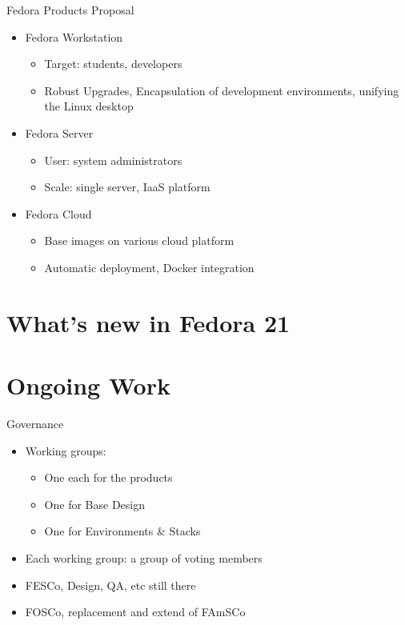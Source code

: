 \documentclass{beamer}
\begin{document}
\begin{frame}{Fedora Products Proposal}
  \begin{itemize}
    \item Fedora Workstation
      \begin{itemize}
        \item Target: students, developers
        \item Robust Upgrades, Encapsulation of development
          environments, unifying the Linux desktop
      \end{itemize}
    \item Fedora Server
      \begin{itemize}
        \item User: system administrators
        \item Scale: single server, IaaS platform
      \end{itemize}
    \item Fedora Cloud
      \begin{itemize}
        \item Base images on various cloud platform
        \item Automatic deployment, Docker integration
      \end{itemize}
  \end{itemize}

\end{frame}

\section{What's new in Fedora 21}


\section{Ongoing Work}

\begin{frame}{Governance}
  \begin{itemize}
    \item Working groups:
      \begin{itemize}
        \item One each for the products
        \item One for Base Design
        \item One for Environments \& Stacks
      \end{itemize}
    \item Each working group: a group of voting members
    \item FESCo, Design, QA, etc still there
    \item FOSCo, replacement and extend of FAmSCo
  \end{itemize}
\end{frame}
\end{document}
